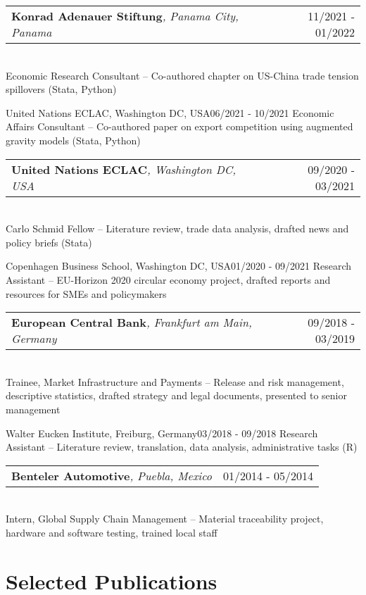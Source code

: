 \documentclass[A4,11pt]{article}
\makeatletter
\newcommand{\Subheading}[5]{   
    \begin{tabular*}{0.97\textwidth}[t]{l@{\extracolsep{\fill}}r}
      \textbf{#1}\textit{\small #2} & \small #3 
      \end{tabular*} \\
      \small #4 \\
    \vspace{7pt}
    }
\makeatother
\begin{document}
    \Subheading
        {Konrad Adenauer Stiftung}{, Panama City, Panama}{11/2021 - 01/2022}
        {Economic Research Consultant -- Co-authored chapter on US-China trade tension spillovers (Stata, Python)}
            
    \Subheading
        {United Nations ECLAC}{, Washington DC, USA}{06/2021 - 10/2021}
        {Economic Affairs Consultant -- Co-authored paper on export competition using augmented gravity models (Stata, Python)}

    \Subheading
        {United Nations ECLAC}{, Washington DC, USA}{09/2020 - 03/2021}
        {Carlo Schmid Fellow -- Literature review, trade data analysis, drafted news and policy briefs  (Stata)}

    \Subheading
        {Copenhagen Business School}{, Washington DC, USA}{01/2020 - 09/2021}
        {Research Assistant -- EU-Horizon 2020 circular economy project, drafted reports and resources for SMEs and policymakers}

    \Subheading
        {European Central Bank}{, Frankfurt am Main, Germany}{09/2018 - 03/2019}
        {Trainee, Market Infrastructure and Payments -- Release and risk management, descriptive statistics, drafted strategy and legal documents, presented to senior management}

    \Subheading
        {Walter Eucken Institute}{, Freiburg, Germany}{03/2018 - 09/2018}
        {Research Assistant -- Literature review, translation, data analysis, administrative tasks (R)}

    \Subheading
        {Benteler Automotive}{, Puebla, Mexico}{01/2014 - 05/2014}
        {Intern, Global Supply Chain Management -- Material traceability project, hardware and software testing, trained local staff}

\newpage
\section{Selected Publications}
\setlength{}
\begin{refsection}
\nocite{*}
\printbibliography[heading=none]
\end{refsection}
      

\end{document}
